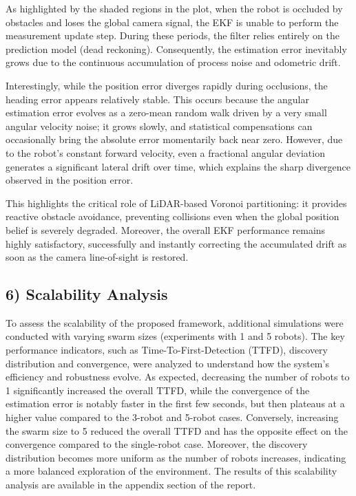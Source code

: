 \documentclass[times, twoside]{zHenriquesLab-StyleBioRxiv}
\begin{document}
As highlighted by the shaded regions in the plot, when the robot is occluded by obstacles and loses the global camera signal, the EKF is unable to perform the measurement update step. During these periods, the filter relies entirely on the prediction model (dead reckoning). Consequently, the estimation error inevitably grows due to the continuous accumulation of process noise and odometric drift.

Interestingly, while the position error diverges rapidly during occlusions, the heading error appears relatively stable. This occurs because the angular estimation error evolves as a zero-mean random walk driven by a very small angular velocity noise; it grows slowly, and statistical compensations can occasionally bring the absolute error momentarily back near zero. However, due to the robot's constant forward velocity, even a fractional angular deviation generates a significant lateral drift over time, which explains the sharp divergence observed in the position error.

This highlights the critical role of LiDAR-based Voronoi partitioning: it provides reactive obstacle avoidance, preventing collisions even when the global position belief is severely degraded. Moreover, the overall EKF performance remains highly satisfactory, successfully and instantly correcting the accumulated drift as soon as the camera line-of-sight is restored.

\subsection*{6) Scalability Analysis}
To assess the scalability of the proposed framework, additional simulations were conducted with varying swarm sizes (experiments with 1 and 5 robots). The key performance indicators, such as Time-To-First-Detection (TTFD), discovery distribution and convergence, were analyzed to understand how the system's efficiency and robustness evolve. As expected, decreasing the number of robots to 1 significantly increased the overall TTFD, while the convergence of the estimation error is notably faster in the first few seconds, but then plateaus at a higher value compared to the 3-robot and 5-robot cases. Conversely, increasing the swarm size to 5 reduced the overall TTFD and has the opposite effect on the convergence compared to the single-robot case. Moreover, the discovery distribution becomes more uniform as the number of robots increases, indicating a more balanced exploration of the environment. The results of this scalability analysis are available in the appendix section of the report.  
\end{document}
